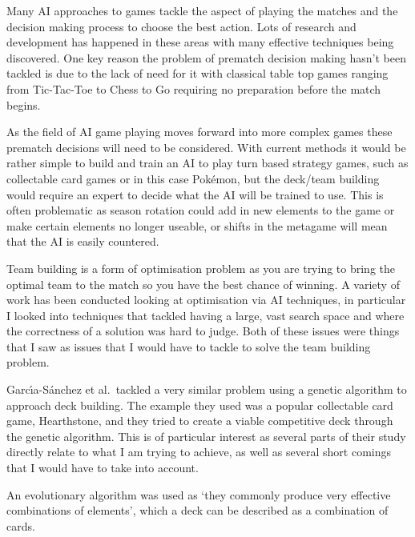 \documentclass[a4paper]{article}
\newcommand{\Pokemon}{Pok\'{e}mon}
\begin{document}
\par
Many AI approaches to games tackle the aspect of playing the matches and the decision making process to choose the best action.
Lots of research and development has happened in these areas with many effective techniques being discovered.
One key reason the problem of prematch decision making hasn't been tackled is due to the lack of need for it with classical table top games ranging from Tic-Tac-Toe to Chess to Go requiring no preparation before the match begins.
\par
As the field of AI game playing moves forward into more complex games these prematch decisions will need to be considered.
With current methods it would be rather simple to build and train an AI to play turn based strategy games, such as collectable card games or in this case \Pokemon{}, but the deck/team building would require an expert to decide what the AI will be trained to use.
This is often problematic as season rotation could add in new elements to the game or make certain elements no longer useable, or shifts in the metagame will mean that the AI is easily countered.
\par
Team building is a form of optimisation problem as you are trying to bring the optimal team to the match so you have the best chance of winning.
A variety of work has been conducted looking at optimisation via AI techniques, in particular I looked into techniques that tackled having a large, vast search space and where the correctness of a solution was hard to judge.
Both of these issues were things that I saw as issues that I would have to tackle to solve the team building problem.
\\ \par
Garc{\'\i}a-S{\'a}nchez et al.\ tackled a very similar problem using a genetic algorithm to approach deck building\cite{hearthstoneAI}.
The example they used was a popular collectable card game, Hearthstone, and they tried to create a viable competitive deck through the genetic algorithm.
This is of particular interest as several parts of their study directly relate to what I am trying to achieve, as well as several short comings that I would have to take into account.
\par
An evolutionary algorithm was used as `they commonly produce very effective combinations of elements', which a deck can be described as a combination of cards.
\end{document}
